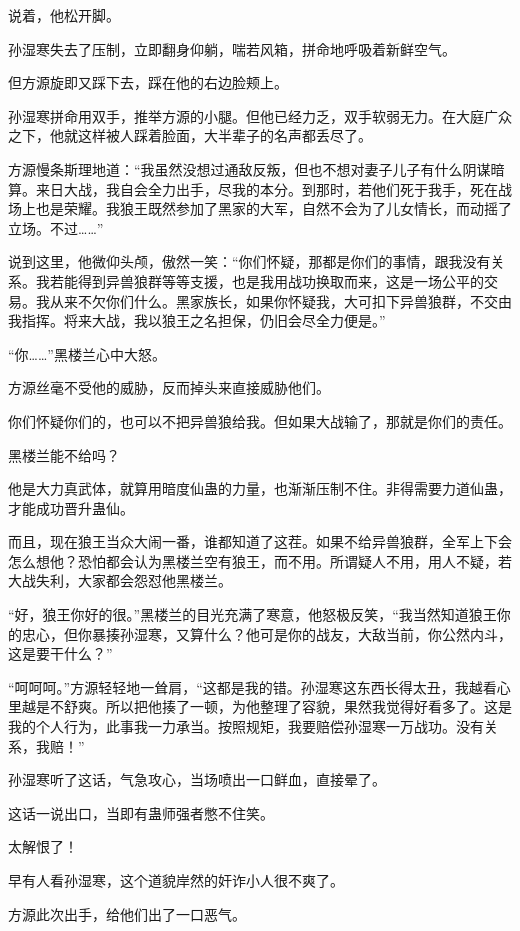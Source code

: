 \begin{this_body}
说着，他松开脚。

孙湿寒失去了压制，立即翻身仰躺，喘若风箱，拼命地呼吸着新鲜空气。

但方源旋即又踩下去，踩在他的右边脸颊上。

孙湿寒拼命用双手，推举方源的小腿。但他已经力乏，双手软弱无力。在大庭广众之下，他就这样被人踩着脸面，大半辈子的名声都丢尽了。

方源慢条斯理地道：“我虽然没想过通敌反叛，但也不想对妻子儿子有什么阴谋暗算。来日大战，我自会全力出手，尽我的本分。到那时，若他们死于我手，死在战场上也是荣耀。我狼王既然参加了黑家的大军，自然不会为了儿女情长，而动摇了立场。不过……”

说到这里，他微仰头颅，傲然一笑：“你们怀疑，那都是你们的事情，跟我没有关系。我若能得到异兽狼群等等支援，也是我用战功换取而来，这是一场公平的交易。我从来不欠你们什么。黑家族长，如果你怀疑我，大可扣下异兽狼群，不交由我指挥。将来大战，我以狼王之名担保，仍旧会尽全力便是。”

“你……”黑楼兰心中大怒。

方源丝毫不受他的威胁，反而掉头来直接威胁他们。

你们怀疑你们的，也可以不把异兽狼给我。但如果大战输了，那就是你们的责任。

黑楼兰能不给吗？

他是大力真武体，就算用暗度仙蛊的力量，也渐渐压制不住。非得需要力道仙蛊，才能成功晋升蛊仙。

而且，现在狼王当众大闹一番，谁都知道了这茬。如果不给异兽狼群，全军上下会怎么想他？恐怕都会认为黑楼兰空有狼王，而不用。所谓疑人不用，用人不疑，若大战失利，大家都会怨怼他黑楼兰。

“好，狼王你好的很。”黑楼兰的目光充满了寒意，他怒极反笑，“我当然知道狼王你的忠心，但你暴揍孙湿寒，又算什么？他可是你的战友，大敌当前，你公然内斗，这是要干什么？”

“呵呵呵。”方源轻轻地一耸肩，“这都是我的错。孙湿寒这东西长得太丑，我越看心里越是不舒爽。所以把他揍了一顿，为他整理了容貌，果然我觉得好看多了。这是我的个人行为，此事我一力承当。按照规矩，我要赔偿孙湿寒一万战功。没有关系，我赔！”

孙湿寒听了这话，气急攻心，当场喷出一口鲜血，直接晕了。

这话一说出口，当即有蛊师强者憋不住笑。

太解恨了！

早有人看孙湿寒，这个道貌岸然的奸诈小人很不爽了。

方源此次出手，给他们出了一口恶气。


\end{this_body}

